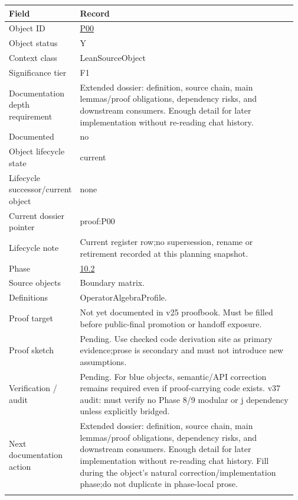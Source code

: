 \begin{longtable}{L{0.16\linewidth} L{0.81\linewidth}}
\hline
\textbf{Field} & \textbf{Record}\\
\hline
Object ID & \hyperlink{object-row-P00}{P00}\\
\hline\addlinespace[0.20em]
Object status & Y\\
\hline\addlinespace[0.20em]
Context class & LeanSourceObject\\
\hline\addlinespace[0.20em]
Significance tier & F1\\
\hline\addlinespace[0.20em]
Documentation depth requirement & Extended dossier: definition, source chain, main lemmas/\allowbreak{}proof obligations, dependency risks, and downstream consumers. Enough detail for later implementation without re-reading chat history.\\
\hline\addlinespace[0.20em]
Documented & no\\
\hline\addlinespace[0.20em]
Object lifecycle state & current\\
\hline\addlinespace[0.20em]
Lifecycle successor/\allowbreak{}current object & none\\
\hline\addlinespace[0.20em]
Current dossier pointer & proof:P00\\
\hline\addlinespace[0.20em]
Lifecycle note & Current register row;\newline no supersession, rename or retirement recorded at this planning snapshot.\\
\hline\addlinespace[0.20em]
Phase & \hyperlink{phase-row-10-2}{10.2}\\
\hline\addlinespace[0.20em]
Source objects & Boundary matrix.\\
\hline\addlinespace[0.20em]
Definitions & OperatorAlgebraProfile.\\
\hline\addlinespace[0.20em]
Proof target & Not yet documented in v25 proofbook. Must be filled before public-final promotion or handoff exposure.\\
\hline\addlinespace[0.20em]
Proof sketch & Pending. Use checked code derivation site as primary evidence;\newline prose is secondary and must not introduce new assumptions.\\
\hline\addlinespace[0.20em]
Verification /\allowbreak{} audit & Pending. For blue objects, semantic/\allowbreak{}API correction remains required even if proof-carrying code exists. v37 audit: must verify no Phase 8/\allowbreak{}9 modular or j dependency unless explicitly bridged.\\
\hline\addlinespace[0.20em]
Next documentation action & Extended dossier: definition, source chain, main lemmas/\allowbreak{}proof obligations, dependency risks, and downstream consumers. Enough detail for later implementation without re-reading chat history. Fill during the object's natural correction/\allowbreak{}implementation phase;\newline do not duplicate in phase-local prose.\\
\hline\addlinespace[0.20em]
\end{longtable}
